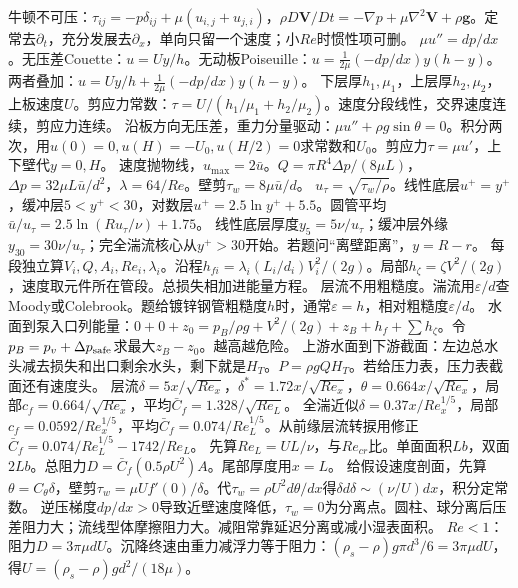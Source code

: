 牛顿不可压：$\tau_{ij}=-p\delta_{ij}+\mu(u_{i,j}+u_{j,i})$，$\rho D\bm V/Dt=-\nabla p+\mu\nabla^2\bm V+\rho\bm g$。定常去$\partial_t$，充分发展去$\partial_x$，单向只留一个速度；小$Re$时惯性项可删。
$\mu u''=dp/dx$。无压差Couette：$u=Uy/h$。无动板Poiseuille：$u=\frac{1}{2\mu}(-dp/dx)y(h-y)$。两者叠加：$u=Uy/h+\frac{1}{2\mu}(-dp/dx)y(h-y)$。
下层厚$h_1,\mu_1$，上层厚$h_2,\mu_2$，上板速度$U$。剪应力常数：$\tau=U/(h_1/\mu_1+h_2/\mu_2)$。速度分段线性，交界速度连续，剪应力连续。
沿板方向无压差，重力分量驱动：$\mu u''+\rho g\sin\theta=0$。积分两次，用$u(0)=0,u(H)=-U_0,u(H/2)=0$求常数和$U_0$。剪应力$\tau=\mu u'$，上下壁代$y=0,H$。
速度抛物线，$u_{\max}=2\bar u$。$Q=\pi R^4\Delta p/(8\mu L)$，$\Delta p=32\mu L\bar u/d^2$，$\lambda=64/Re$。壁剪$\tau_w=8\mu\bar u/d$。
$u_\tau=\sqrt{\tau_w/\rho}$。线性底层$u^+=y^+$，缓冲层$5<y^+<30$，对数层$u^+=2.5\ln y^+ +5.5$。圆管平均$\bar u/u_\tau=2.5\ln(Ru_\tau/\nu)+1.75$。
线性底层厚度$y_5=5\nu/u_\tau$；缓冲层外缘$y_{30}=30\nu/u_\tau$；完全湍流核心从$y^+>30$开始。若题问“离壁距离”，$y=R-r$。
每段独立算$V_i,Q,A_i,Re_i,\lambda_i$。沿程$h_{fi}=\lambda_i(L_i/d_i)V_i^2/(2g)$。局部$h_\zeta=\zeta V^2/(2g)$，速度取元件所在管段。总损失相加进能量方程。
层流不用粗糙度。湍流用$\varepsilon/d$查Moody或Colebrook。题给镀锌钢管粗糙度$h$时，通常$\varepsilon=h$，相对粗糙度$\varepsilon/d$。
水面到泵入口列能量：$0+0+z_0=p_B/\rho g+V^2/(2g)+z_B+h_f+\sum h_\zeta$。令$p_B=p_v+\Delta p_{\rm safe}$求最大$z_B-z_0$。越高越危险。
上游水面到下游截面：左边总水头减去损失和出口剩余水头，剩下就是$H_T$。$P=\rho gQH_T$。若给压力表，压力表截面还有速度头。
层流$\delta=5x/\sqrt{Re_x}$，$\delta^*=1.72x/\sqrt{Re_x}$，$\theta=0.664x/\sqrt{Re_x}$，局部$c_f=0.664/\sqrt{Re_x}$，平均$\bar C_f=1.328/\sqrt{Re_L}$。
全湍近似$\delta=0.37x/Re_x^{1/5}$，局部$c_f=0.0592/Re_x^{1/5}$，平均$\bar C_f=0.074/Re_L^{1/5}$。从前缘层流转捩用修正$\bar C_f=0.074/Re_L^{1/5}-1742/Re_L$。
先算$Re_L=UL/\nu$，与$Re_{cr}$比。单面面积$Lb$，双面$2Lb$。总阻力$D=\bar C_f(0.5\rho U^2)A$。尾部厚度用$x=L$。
给假设速度剖面，先算$\theta=C_\theta\delta$，壁剪$\tau_w=\mu U f'(0)/\delta$。代$\tau_w=\rho U^2d\theta/dx$得$\delta d\delta\sim(\nu/U)dx$，积分定常数。
逆压梯度$dp/dx>0$导致近壁速度降低，$\tau_w=0$为分离点。圆柱、球分离后压差阻力大；流线型体摩擦阻力大。减阻常靠延迟分离或减小湿表面积。
$Re<1$：阻力$D=3\pi\mu dU$。沉降终速由重力减浮力等于阻力：$(\rho_s-\rho)g\pi d^3/6=3\pi\mu dU$，得$U=(\rho_s-\rho)gd^2/(18\mu)$。

